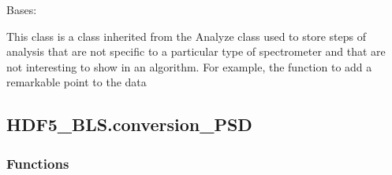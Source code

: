\documentclass[letterpaper,10pt,english]{sphinxmanual}
\begin{document}

\begin{fulllineitems}
\label{\detokenize{_autosummary/HDF5_BLS.analyze:HDF5_BLS.analyze.Analyze_general}}
\pysigstartsignatures
\pysiglinewithargsret
{}
{\sphinxparamcomma {}}
{}
\pysigstopsignatures
\sphinxAtStartPar
Bases: {\hyperref[\detokenize{_autosummary/HDF5_BLS.analyze:HDF5_BLS.analyze.Analyze}]{}}

\sphinxAtStartPar
This class is a class inherited from the Analyze class used to store steps of analysis that are not specific to a particular type of spectrometer and that are not interesting to show in an algorithm. For example, the function to add a remarkable point to the data

\end{fulllineitems}


\sphinxstepscope


\subsection{HDF5\_BLS.conversion\_PSD}
\label{\detokenize{_autosummary/HDF5_BLS.conversion_PSD:module-HDF5_BLS.conversion_PSD}}\label{\detokenize{_autosummary/HDF5_BLS.conversion_PSD:hdf5-bls-conversion-psd}}\label{\detokenize{_autosummary/HDF5_BLS.conversion_PSD::doc}}\subsubsection*{Functions}
\end{document}
